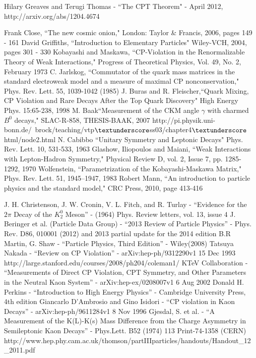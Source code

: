 \documentclass[floatfix,aps,prd,amsmath,amssymb]{revtex4}
\begin{document}
\begin{thebibliography}{10}
Hilary Greaves and Terugi Thomas - ``The CPT Theorem" - April 2012, http://arxiv.org/abs/1204.4674

Frank Close, ``The new cosmic onion,"  London: Taylor \& Francis, 2006, pages 149 - 161
David Griffiths, ``Introduction to Elementary Particles"  Wiley-VCH, 2004, pages 301 - 330
Kobayashi and Maskawa, ``CP-Violation in the Renormalizable Theory of Weak Interactions," Progress of Theoretical Physics, Vol. 49, No. 2, February 1973
C. Jarlskog, ``Commutator of the quark mass matrices in the standard electroweak model and a measure of maximal CP nonconservation," Phys. Rev. Lett. 55, 1039-1042 (1985)
J. Buras and R. Fleischer,``Quark Mixing, CP Violation and Rare Decays After the Top Quark Discovery" High Energy Phys. 15:65-238, 1998
M. Baak``Measurement of the CKM angle $\gamma$ with charmed $B^{0}$ decays," SLAC-R-858, THESIS-BAAK, 2007
http://pi.physik.uni-bonn.de/~brock/teaching/vtp$\textunderscore$ss03/chapter4$\textunderscore$html/node2.html
N. Cabibbo ``Unitary Symmetry and Leptonic Decays" Phys. Rev. Lett. 10, 531-533, 1963
Glashow, Iliopoulos and Maiani, ``Weak Interactions with Lepton-Hadron Symmetry," Physical Review D, vol. 2, Issue 7, pp. 1285-1292, 1970
Wolfenstein, ``Parametrization of the Kobayashi-Maskawa Matrix," Phys. Rev. Lett. 51, 1945–1947, 1983 
Robert Mann, ``An introduction to particle physics and the standard model," CRC Press, 2010, page 413-416

J. H. Christenson, J. W. Cronin, V. L. Fitch, and R. Turlay - ``Evidence for the $2 \pi$ Decay of the $K^0_2$ Meson'' - (1964) Phys. Review letters, vol. 13, issue 4
J. Beringer et al. (Particle Data Group) - ``2013 Review of Particle Physics'' - Phys. Rev. D86, 010001 (2012) and 2013 partial update for the 2014 edition 
B.R Martin, G. Shaw - ``Particle Physics, Third Edition'' - Wiley(2008)  
Tatsuya Nakada - ``Review on CP Violation'' - arXiv:hep-ph/9312290v1 15 Dec 1993 
http://large.stanford.edu/courses/2008/ph204/coleman1/  
KTeV Collaboration - ``Measurements of Direct CP Violation, CPT Symmetry, and Other Parameters in the Neutral Kaon System'' - arXiv:hep-ex/0208007v1 6 Aug 2002 
Donald H. Perkins - ``Introduction to High Energy Physics'' - Cambridge University Press, 4th edition 
Giancarlo D’Ambrosio and Gino Isidori - ``CP violation in Kaon Decays'' - arXiv:hep-ph/9611284v1 8 Nov 1996
Gjesdal, S. et al. - ``A Measurement of the K(L)-K(s) Mass Difference from the Charge Asymmetry in Semileptonic Kaon Decays'' - Phys.Lett. B52 (1974) 113 Print-74-1358 (CERN) 
http://www.hep.phy.cam.ac.uk/thomson/partIIIparticles/handouts/Handout\_12\_2011.pdf


\end{thebibliography}
\end{document}
